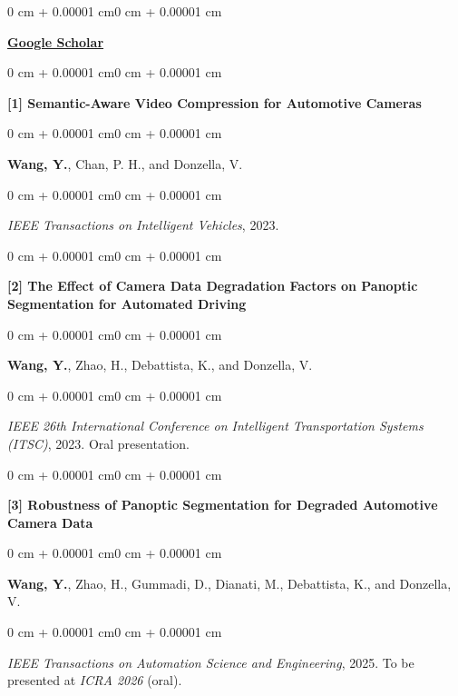 \documentclass[10pt, letterpaper]{article}
\newenvironment{onecolentry}{
    \begin{adjustwidth}{0 cm + 0.00001 cm}{0 cm + 0.00001 cm}
}{
    \end{adjustwidth}
}
\begin{document}
\begin{onecolentry}
    \href{https://scholar.google.com/citations?hl=en&user=xbQjJgYAAAAJ&view_op=list_works}{\textbf{Google Scholar}}
\end{onecolentry}

\vspace{0.15cm}

\begin{onecolentry}
    \textbf{[1] Semantic-Aware Video Compression for Automotive Cameras}
\end{onecolentry}
\begin{onecolentry}
    \textbf{Wang, Y.}, Chan, P. H., and Donzella, V.
\end{onecolentry}
\begin{onecolentry}
    \textit{IEEE Transactions on Intelligent Vehicles}, 2023.
\end{onecolentry}

\vspace{0.18cm}

\begin{onecolentry}
    \textbf{[2] The Effect of Camera Data Degradation Factors on Panoptic Segmentation for Automated Driving}
\end{onecolentry}
\begin{onecolentry}
    \textbf{Wang, Y.}, Zhao, H., Debattista, K., and Donzella, V.
\end{onecolentry}
\begin{onecolentry}
    \textit{IEEE 26th International Conference on Intelligent Transportation Systems (ITSC)}, 2023. Oral presentation.
\end{onecolentry}

\vspace{0.18cm}

\begin{onecolentry}
    \textbf{[3] Robustness of Panoptic Segmentation for Degraded Automotive Camera Data}
\end{onecolentry}
\begin{onecolentry}
    \textbf{Wang, Y.}, Zhao, H., Gummadi, D., Dianati, M., Debattista, K., and Donzella, V.
\end{onecolentry}
\begin{onecolentry}
    \textit{IEEE Transactions on Automation Science and Engineering}, 2025. To be presented at \textit{ICRA 2026} (oral).
\end{onecolentry}

\vspace{0.18cm}
\end{document}

